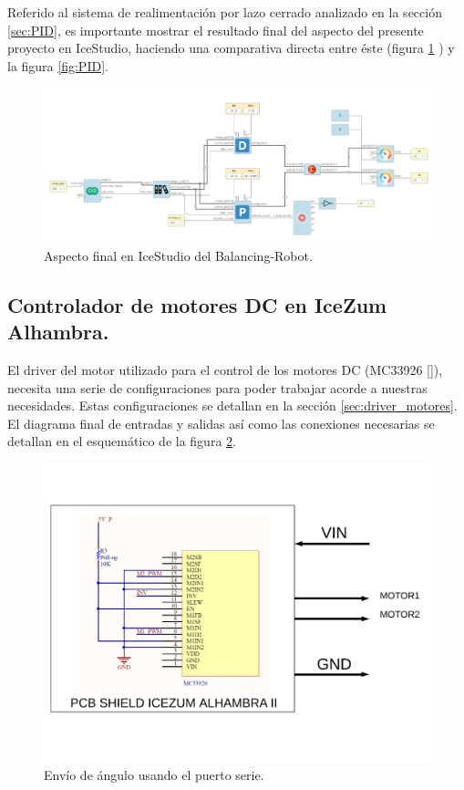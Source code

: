 Referido al sistema de realimentación por lazo cerrado analizado en la sección \ref{sec:PID}, es importante mostrar el resultado final del aspecto del presente proyecto en IceStudio, haciendo una comparativa directa entre éste (figura \ref{fig:finalIceStudio} ) y la figura \ref{fig:PID}.
 \newpage
\begin{figure}[H]
	\center
	\includegraphics[scale=0.6, angle=90]{imagenes/Balancing_robot/finalIceStudio}
	\caption{Aspecto final en IceStudio del Balancing-Robot.}
	\label{fig:finalIceStudio}
\end{figure}


\subsection{Controlador de motores DC en IceZum Alhambra.}
El driver del motor utilizado para el control de los motores DC (MC33926 []), necesita una serie de configuraciones para poder trabajar acorde a nuestras necesidades. Estas configuraciones se detallan en la sección \ref{sec:driver_motores}. El diagrama final de entradas y salidas así como las conexiones necesarias se detallan en el esquemático de la figura \ref{fig:extraccion_angulo}.


\begin{figure}[H]
	\center
	\includegraphics[trim = 0mm 3cm 0mm 2cm, clip,scale=0.6]{imagenes/Balancing_robot/driver_motor.pdf}
	\caption{Envío de ángulo usando el puerto serie.}
	\label{fig:extraccion_angulo}
\end{figure}


